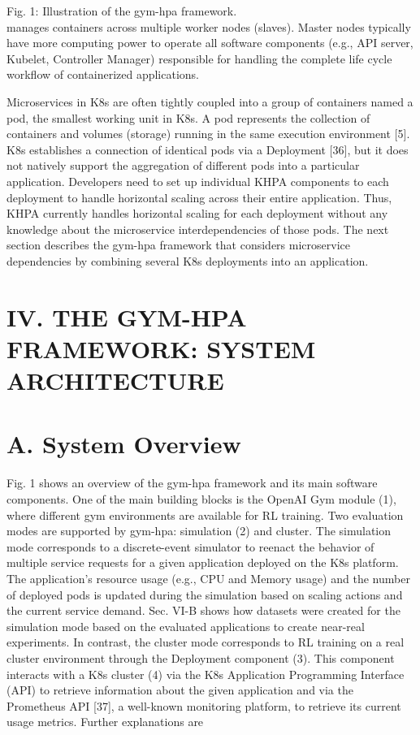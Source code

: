 \documentclass[10pt]{article}
\begin{document}
Fig. 1: Illustration of the gym-hpa framework.\\
manages containers across multiple worker nodes (slaves). Master nodes typically have more computing power to operate all software components (e.g., API server, Kubelet, Controller Manager) responsible for handling the complete life cycle workflow of containerized applications.

Microservices in K8s are often tightly coupled into a group of containers named a pod, the smallest working unit in K8s. A pod represents the collection of containers and volumes (storage) running in the same execution environment [5]. K8s establishes a connection of identical pods via a Deployment [36], but it does not natively support the aggregation of different pods into a particular application. Developers need to set up individual KHPA components to each deployment to handle horizontal scaling across their entire application. Thus, KHPA currently handles horizontal scaling for each deployment without any knowledge about the microservice interdependencies of those pods. The next section describes the gym-hpa framework that considers microservice dependencies by combining several K8s deployments into an application.

\section*{IV. THE GYM-HPA FRAMEWORK: SYSTEM ARCHITECTURE}
\section*{A. System Overview}
Fig. 1 shows an overview of the gym-hpa framework and its main software components. One of the main building blocks is the OpenAI Gym module (1), where different gym environments are available for RL training. Two evaluation modes are supported by gym-hpa: simulation (2) and cluster. The simulation mode corresponds to a discrete-event simulator to reenact the behavior of multiple service requests for a given application deployed on the K8s platform. The application's resource usage (e.g., CPU and Memory usage) and the number of deployed pods is updated during the simulation based on scaling actions and the current service demand. Sec. VI-B shows how datasets were created for the simulation mode based on the evaluated applications to create near-real experiments. In contrast, the cluster mode corresponds to RL training on a real cluster environment through the Deployment component (3). This component interacts with a K8s cluster (4) via the K8s Application Programming Interface (API) to retrieve information about the given application and via the Prometheus API [37], a well-known monitoring platform, to retrieve its current usage metrics. Further explanations are
\end{document}
